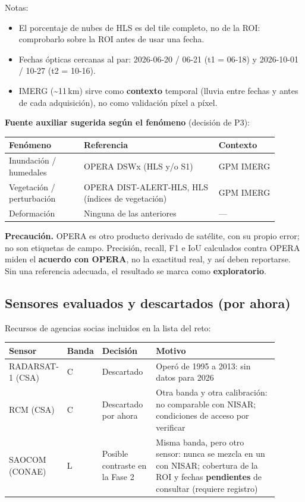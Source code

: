 \documentclass[11pt,a4paper]{article}
\begin{document}
Notas:

\begin{itemize}
  \item El porcentaje de nubes de HLS es del tile completo, no de la ROI: comprobarlo sobre la ROI antes de usar una fecha.
  \item Fechas ópticas cercanas al par: 2026-06-20 / 06-21 (t1 = 06-18) y 2026-10-01 / 10-27 (t2 = 10-16).
  \item IMERG (\textasciitilde 11\,km) sirve como \textbf{contexto} temporal (lluvia entre fechas y antes de cada adquisición),
        no como validación píxel a píxel.
\end{itemize}

\textbf{Fuente auxiliar sugerida según el fenómeno} (decisión de P3):

\begin{longtable}{p{0.25\linewidth}p{0.45\linewidth}p{0.20\linewidth}}
\toprule
\textbf{Fenómeno} & \textbf{Referencia} & \textbf{Contexto} \\
\midrule
\endhead
Inundación / humedales & OPERA DSWx (HLS y/o S1) & GPM IMERG \\
Vegetación / perturbación & OPERA DIST-ALERT-HLS, HLS (índices de vegetación) & GPM IMERG \\
Deformación & Ninguna de las anteriores & --- \\
\bottomrule
\end{longtable}

\textbf{Precaución.} OPERA es otro producto derivado de satélite, con su propio error; no son etiquetas de campo.
Precisión, recall, F1 e IoU calculados contra OPERA miden el \textbf{acuerdo con OPERA}, no la exactitud real,
y así deben reportarse. Sin una referencia adecuada, el resultado se marca como \textbf{exploratorio}.

\subsection{Sensores evaluados y descartados (por ahora)}

Recursos de agencias socias incluidos en la lista del reto:

\begin{longtable}{p{0.17\linewidth}p{0.07\linewidth}p{0.20\linewidth}p{0.46\linewidth}}
\toprule
\textbf{Sensor} & \textbf{Banda} & \textbf{Decisión} & \textbf{Motivo} \\
\midrule
\endhead
RADARSAT-1 (CSA) & C & Descartado & Operó de 1995 a 2013: sin datos para 2026 \\
RCM (CSA) & C & Descartado por ahora & Otra banda y otra calibración: no comparable con NISAR; condiciones de acceso por verificar \\
SAOCOM (CONAE) & L & Posible contraste en la Fase 2 & Misma banda, pero otro sensor: nunca se mezcla en un \dsz{} con NISAR; cobertura de la ROI y fechas \textbf{pendientes} de consultar (requiere registro) \\
\bottomrule
\end{longtable}
\end{document}
